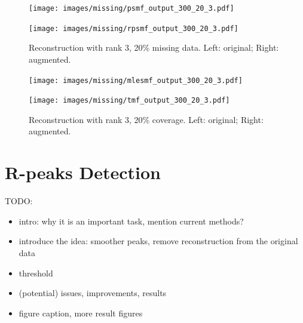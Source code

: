 \documentclass{mldsmsc}
\begin{document}


\begin{figure}[H]
\centering
\begin{minipage}{0.4\linewidth}
    \centering
    \texttt{[image: images/missing/psmf\_output\_300\_20\_3.pdf]}
    \label{fig:limp}
\end{minipage}%
\hspace{0.05\linewidth}
\begin{minipage}{0.4\linewidth}
    \centering
    \texttt{[image: images/missing/rpsmf\_output\_300\_20\_3.pdf]}
    \label{fig:augmented}
\end{minipage}
\caption{Reconstruction with rank 3, 20\% missing data. Left: original; Right: augmented.}
\end{figure}

\begin{figure}[H]
\centering
\begin{minipage}{0.4\linewidth}
    \centering
    \texttt{[image: images/missing/mlesmf\_output\_300\_20\_3.pdf]}
    \label{fig:limp}
\end{minipage}%
\hspace{0.05\linewidth}
\begin{minipage}{0.4\linewidth}
    \centering
    \texttt{[image: images/missing/tmf\_output\_300\_20\_3.pdf]}
    \label{fig:augmented}
\end{minipage}
\caption{Reconstruction with rank 3, 20\% coverage. Left: original; Right: augmented.}
\end{figure}

\section{R-peaks Detection}

TODO:
\begin{itemize}
    \item intro: why it is an important task, mention current methods?
    \item introduce the idea: smoother peaks, remove reconstruction from the original data
    \item threshold
    \item (potential) issues, improvements, results
    \item figure caption, more result figures
\end{itemize}
\end{document}
